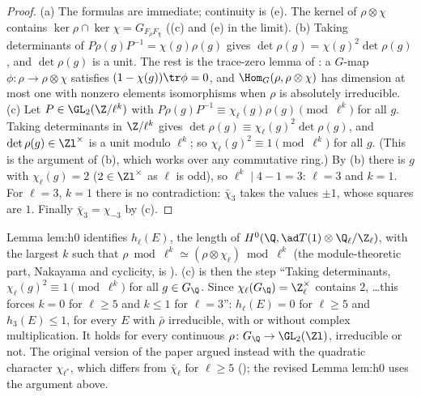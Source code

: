 \begin{proof}
(a) The formulas are immediate; continuity is (e). The kernel of $\rho\otimes\chi$ contains $\ker\rho\cap\ker\chi=G_{F_\rho F_\chi}$
((c) and (e) in the limit).
(b) Taking determinants of $P\rho(g)P^{-1}=\chi(g)\rho(g)$ gives $\det\rho(g)=\chi(g)^2\det\rho(g)$, and $\det\rho(g)$ is a unit. The rest is the trace-zero lemma of
: a $G$-map $\phi\colon\rho\to\rho\otimes\chi$ satisfies $(1-\chi(g))\tr\phi=0$, and $\Hom_G(\rho,\rho\otimes\chi)$ has dimension at most one with nonzero
elements isomorphisms when $\rho$ is absolutely irreducible.
(c) Let $P\in\GL_2(\Z/\ell^k)$ with $P\rho(g)P^{-1}\equiv\chi_\ell(g)\rho(g)\pmod{\ell^k}$ for all $g$. Taking determinants in $\Z/\ell^k$ gives
$\det\rho(g)\equiv\chi_\ell(g)^2\det\rho(g)$, and $\det\rho(g)\in\Zl^\times$ is a unit modulo $\ell^k$; so $\chi_\ell(g)^2\equiv1\pmod{\ell^k}$ for all $g$. (This is the
argument of (b), which works over any commutative ring.) By
(b) there is $g$ with $\chi_\ell(g)=2$ ($2\in\Zl^\times$ as $\ell$ is odd), so $\ell^k\mid4-1=3$: $\ell=3$ and $k=1$. For $\ell=3$, $k=1$ there is no contradiction: $\bar\chi_3$ takes the values $\pm1$, whose squares are $1$. Finally
$\bar\chi_3=\chi_{-3}$ by (c).
\end{proof}

\begin{paperlink}
Lemma lem:h0 identifies $h_\ell(E)$, the length of $H^0(\Q,\ad T(1)\otimes\Q_\ell/\Z_\ell)$, with the largest $k$ such that $\rho\bmod\ell^k\simeq(\rho\otimes\chi_\ell)
\bmod\ell^k$ (the module-theoretic part, Nakayama and cyclicity, is ). (c) is then the step ``Taking determinants,
$\chi_\ell(g)^2\equiv1\pmod{\ell^k}$ for all $g\in G_\Q$. Since $\chi_\ell(G_\Q)=\Z_\ell^\times$ contains $2$, \dots this forces $k=0$ for $\ell\ge5$ and $k\le1$ for
$\ell=3$'': $h_\ell(E)=0$ for $\ell\ge5$ and $h_3(E)\le1$, for every $E$ with $\bar\rho$ irreducible, with or without complex multiplication. It holds for every continuous
$\rho\colon G_\Q\to\GL_2(\Zl)$, irreducible or not. The original version of the paper argued instead with the quadratic character $\chi_{\ell^*}$, which differs from
$\bar\chi_\ell$ for $\ell\ge5$ (); the revised Lemma lem:h0 uses the argument above.
\end{paperlink}

